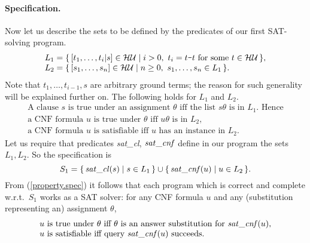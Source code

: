 \documentclass{tlp}
\newcommand*{\seq}[2][n]  {{#2_{1}, \allowbreak \ldots, \allowbreak #2_{#1}}}
\newcommand*{\mydash}{{\mbox{\tt-}}}
\newcommand*{\HU}{{\ensuremath{\cal{H U}}}\xspace}
\begin{document}
\paragraph{Specification.}
Now let us describe the sets to be defined by the predicates of our first 
SAT-solving program.  
\begin{equation}
\label{L1L2}
  \begin{array}{l}
 L_1 = \{\, [\seq[i]t|s]\in\HU \mid  i>0,\ 
            \mbox{$t_i = t\mydash t$ for some $t\in\HU$} \,\},
    \\
    L_2 = \{\, [\seq s]\in\HU \mid n\geq0,\ \seq s\in L_1 \,\}.
  \end{array}
\end{equation}
Note that $t_1,\ldots,t_{i-1},s$ are arbitrary ground terms; the reason for
such generality will be explained further on.
The following holds for $L_1$ and $L_2$.
\begin{equation}
\label{property.spec}
  \begin{array}{l}
    \mbox{A clause $s$ is true under an assignment $\theta$ iff the list
      $s\theta$ is in $L_1$. Hence}
    \\
    \mbox{a CNF formula $u$ is true under $\theta$ iff $u\theta$ is
      in $L_2$,} 
    \\
    \mbox{a CNF formula $u$ is satisfiable iff $u$ has an instance in $L_2$.} 
  \end{array}
\end{equation}
Let us require that predicates {\it sat\_cl}, ${\it sat\_c n f}$ define
in our program the sets $L_1,L_2$.
So the specification is 
\[
S_1 = \{\, {\it sat\_cl}(s) \mid s\in L_1\,\}
 \cup \{\, {\it sat\_c n f}(u) \mid u\in L_2\,\}.
\]
From  (\ref{property.spec}) it follows that each program
which is correct and complete w.r.t.\ $S_1$ works as a SAT solver:
for any CNF formula $u$ and any (substitution representing an) assignment
$\theta$,
\begin{equation}
\label{property.program}
{\hspace*{-2em}
    \begin{tabular}{@{}l@{}}
      $u$ is true under $\theta$ iff
      $\theta$ is an answer substitution for ${\it sat\_c n f}(u)$,     
      \\
      $u$ is satisfiable iff query ${\it sat\_c n f}(u)$ succeeds.
    \end{tabular}\hspace*{-2em}
}
\end{equation}
\end{document}
